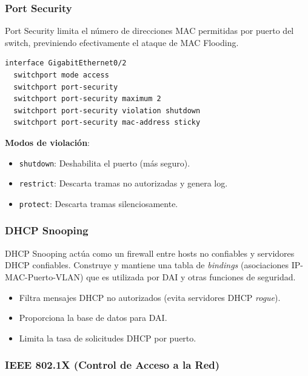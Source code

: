 \documentclass[12pt, a4paper]{article}
\begin{document}
\subsubsection{Port Security}

Port Security limita el n\'umero de direcciones MAC permitidas por puerto del switch, previniendo efectivamente el ataque de MAC Flooding.

\begin{lstlisting}[style=bashstyle, caption={Configuraci\'on de Port Security en Cisco IOS}]
interface GigabitEthernet0/2
  switchport mode access
  switchport port-security
  switchport port-security maximum 2
  switchport port-security violation shutdown
  switchport port-security mac-address sticky
\end{lstlisting}

\textbf{Modos de violaci\'on}:
\begin{itemize}[leftmargin=2cm]
    \item \texttt{shutdown}: Deshabilita el puerto (m\'as seguro).
    \item \texttt{restrict}: Descarta tramas no autorizadas y genera log.
    \item \texttt{protect}: Descarta tramas silenciosamente.
\end{itemize}

\subsubsection{DHCP Snooping}

DHCP Snooping act\'ua como un firewall entre hosts no confiables y servidores DHCP confiables. Construye y mantiene una tabla de \textit{bindings} (asociaciones IP-MAC-Puerto-VLAN) que es utilizada por DAI y otras funciones de seguridad.

\begin{itemize}[leftmargin=2cm]
    \item Filtra mensajes DHCP no autorizados (evita servidores DHCP \textit{rogue}).
    \item Proporciona la base de datos para DAI.
    \item Limita la tasa de solicitudes DHCP por puerto.
\end{itemize}

\subsubsection{IEEE 802.1X (Control de Acceso a la Red)}
\end{document}
